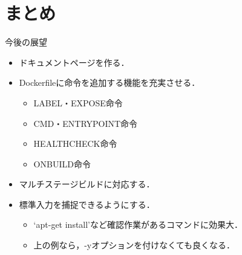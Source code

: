 \documentclass[dvipdfmx, 12pt]{beamer}
\begin{document}
\section{まとめ}

\begin{frame}{今後の展望}
    \begin{itemize}
        \setlength{\itemsep}{1.0zh}
        \item ドキュメントページを作る．
        \item Dockerfileに命令を追加する機能を充実させる．
        \begin{itemize}
            \item LABEL・EXPOSE命令
            \item CMD・ENTRYPOINT命令
            \item HEALTHCHECK命令
            \item ONBUILD命令
        \end{itemize}
        \item マルチステージビルドに対応する．
        \item 標準入力を捕捉できるようにする．
        \begin{itemize}
            \item `apt-get install'など確認作業があるコマンドに効果大．
            \item 上の例なら，-yオプションを付けなくても良くなる．
        \end{itemize}
    \end{itemize}
\end{frame}


\end{document}
